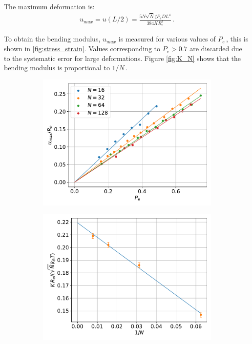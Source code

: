 \documentclass[bachelor,       %
               oneside,        %
               BCOR10mm,       %
               ngerman, english %
               ]{GAUBM}
\begin{document}
The maximum deformation is:
\begin{align}
    u_{max}=u(L/2)=\frac{5N\sqrt{\bar N}\zeta P_e DL^4}{384KR_e^4}\,.
    \label{eq:umax}
\end{align}

To obtain the bending modulus, $u_{max}$ is measured for various values of $P_e\,$, this is shown in \autoref{fig:stress_strain}. Values corresponding to $P_e>0.7$ are discarded due to the systematic error for large deformations. Figure \autoref{fig:K_N} shows that the bending modulus is proportional to $1/N\,.$




\begin{figure}[h]
  \centering
 \begin{subfigure}[b]{0.45\textwidth}
    \centering
    \includegraphics[width=\textwidth]{figures/stress_strain_plot.pdf}
    \caption{}
    \label{fig:stress_strain}
\end{subfigure}
    \hfill
  \begin{subfigure}[b]{0.45\textwidth}
      \centering
      \includegraphics[width=\textwidth]{figures/K-N.pdf}

\end{subfigure}
\end{figure}
\end{document}
